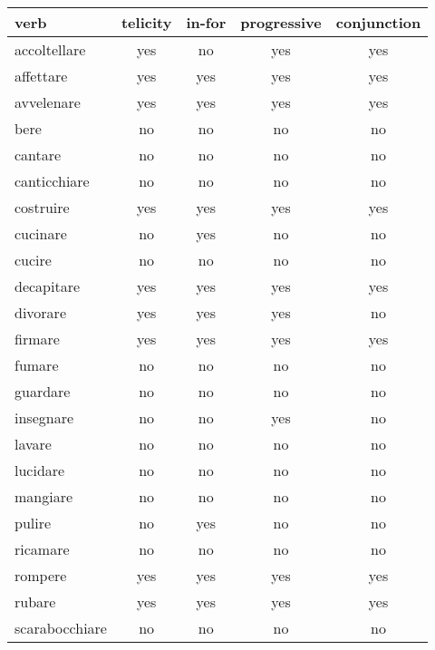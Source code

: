 \begin{longtable}{lc|ccc}
\textbf{verb} & \textbf{telicity} & \textbf{in-for} & \textbf{progressive} & \textbf{conjunction}\\
\hline
\endhead
accoltellare   & yes      & no     & yes         & yes         \\
affettare      & yes      & yes    & yes         & yes         \\
avvelenare     & yes      & yes    & yes         & yes         \\
bere           & no       & no     & no          & no          \\
cantare        & no       & no     & no          & no          \\
canticchiare   & no       & no     & no          & no          \\
costruire      & yes      & yes    & yes         & yes         \\
cucinare       & no       & yes    & no          & no          \\
cucire         & no       & no     & no          & no          \\
decapitare     & yes      & yes    & yes         & yes         \\
divorare       & yes      & yes    & yes         & no          \\
firmare        & yes      & yes    & yes         & yes         \\
fumare         & no       & no     & no          & no          \\
guardare       & no       & no     & no          & no          \\
insegnare      & no       & no     & yes         & no          \\
lavare         & no       & no     & no          & no          \\
lucidare       & no       & no     & no          & no          \\
mangiare       & no       & no     & no          & no          \\
pulire         & no       & yes    & no          & no          \\
ricamare       & no       & no     & no          & no          \\
rompere        & yes      & yes    & yes         & yes         \\
rubare         & yes      & yes    & yes         & yes         \\
scarabocchiare & no       & no     & no          & no          \\

\end{longtable}
